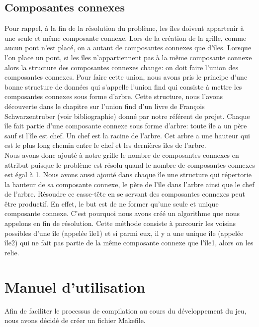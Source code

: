 \documentclass[french]{article}
\begin{document}
        \subsection{\Large Composantes connexes}
    \hspace{0.5cm} Pour rappel, à la fin de la résolution du problème, les îles doivent appartenir à une seule et même composante connexe. Lors de la création de la grille, comme aucun pont n'est placé, on a autant de composantes connexes que d'îles. Lorsque l'on place un pont, si les îles n'appartiennent pas à la même composante connexe alors la structure des composantes connexes change: on doit faire l'union des composantes connexes. Pour faire cette union, nous avons pris le principe d'une bonne structure de données qui s'appelle l'union find qui consiste à mettre les composantes connexes sous forme d'arbre. Cette structure, nous l'avons découverte dans le chapitre sur l'union find d'un livre de François Schwarzentruber (voir bibliographie) donné par notre référent de projet. Chaque île fait partie d'une composante connexe sous forme d'arbre: toute île a un père sauf si l'île est chef. Un chef est la racine de l'arbre. Cet arbre a une hauteur qui est le plus long chemin entre le chef et les dernières îles de l'arbre.\\
    Nous avons donc ajouté à notre grille le nombre de composantes connexes en attribut puisque le problème est résolu quand le nombre de composantes connexes est égal à 1. Nous avons aussi ajouté dans chaque île une structure qui répertorie la hauteur de sa composante connexe, le père de l'île dans l'arbre ainsi que le chef de l'arbre. 
    Résoudre ce casse-tête en se servant des composantes connexes peut être productif. En effet, le but est de ne former qu'une seule et unique composante connexe. C'est pourquoi nous avons créé un algorithme que nous appelons en fin de résolution. Cette méthode consiste à parcourir les voisins possibles d'une île (appelée île1) et si parmi eux, il y a une unique île (appelée île2) qui ne fait pas partie de la même composante connexe que l'île1, alors on les relie.
\section{\LARGE Manuel d'utilisation}

\hspace{0.5cm} Afin de faciliter le processus de compilation au cours du développement du jeu, nous avons décidé de créer un fichier Makefile. \newline
\end{document}
